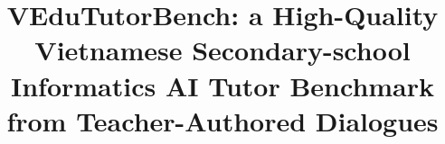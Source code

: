 \documentclass[conference]{IEEEtran}
\newcommand{\benchmarkname}{VEduTutorBench}
\begin{document}
\title{\benchmarkname: a High-Quality Vietnamese Secondary-school Informatics AI Tutor Benchmark from Teacher-Authored Dialogues}

\end{document}

